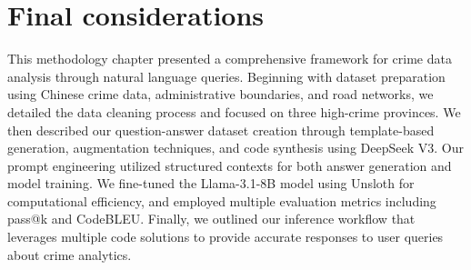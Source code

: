 \section{Final considerations}

This methodology chapter presented a comprehensive framework for crime data analysis through natural language queries. Beginning with dataset preparation using Chinese crime data, administrative boundaries, and road networks, we detailed the data cleaning process and focused on three high-crime provinces. We then described our question-answer dataset creation through template-based generation, augmentation techniques, and code synthesis using DeepSeek V3. Our prompt engineering utilized structured contexts for both answer generation and model training. We fine-tuned the Llama-3.1-8B model using Unsloth for computational efficiency, and employed multiple evaluation metrics including pass@k and CodeBLEU. Finally, we outlined our inference workflow that leverages multiple code solutions to provide accurate responses to user queries about crime analytics.
